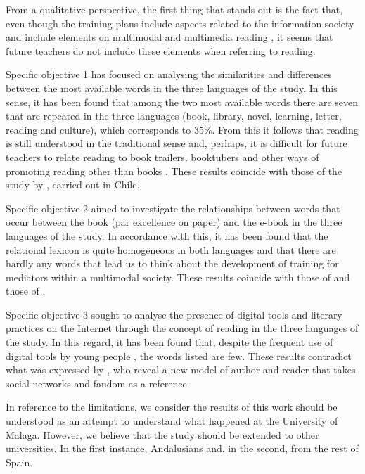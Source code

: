 \documentclass[english]{textolivre}
\begin{document}
From a qualitative perspective, the first thing that stands out is the fact that, even though the training plans include aspects related to the information society and include elements on multimodal and multimedia reading \cite{soto-vazquez_didactica_2022}, it seems that future teachers do not include these elements when referring to reading.

Specific objective 1 has focused on analysing the similarities and differences between the most available words in the three languages of the study. In this sense, it has been found that among the two most available words there are seven that are repeated in the three languages (book, library, novel, learning, letter, reading and culture), which corresponds to 35\%. From this it follows that reading is still understood in the traditional sense and, perhaps, it is difficult for future teachers to relate reading to book trailers, booktubers and other ways of promoting reading other than books \cite{alcocer_vazquez_practicas_2021,gomez_domingo_percepciones_2022}. These results coincide with those of the study by \textcite{castillo_fadic_lexico_2020}, carried out in Chile.

Specific objective 2 aimed to investigate the relationships between words that occur between the book (par excellence on paper) and the e-book in the three languages of the study. In accordance with this, it has been found that the relational lexicon is quite homogeneous in both languages and that there are hardly any words that lead us to think about the development of training for mediators within a multimodal society. These results coincide with those of \textcite{castillo_fadic_lexico_2020} and those of \textcite{juarez_calvillo_influencia_2019}.

Specific objective 3 sought to analyse the presence of digital tools and literary practices on the Internet through the concept of reading in the three languages of the study. In this regard, it has been found that, despite the frequent use of digital tools by young people \cite{rowsell_social_2018}, the words listed are few. These results contradict what was expressed by \textcite{cordon_garcia_socializacion_2023}, who reveal a new model of author and reader that takes social networks and fandom as a reference.

In reference to the limitations, we consider the results of this work should be understood as an attempt to understand what happened at the University of Malaga. However, we believe that the study should be extended to other universities. In the first instance, Andalusians and, in the second, from the rest of Spain.
\end{document}
